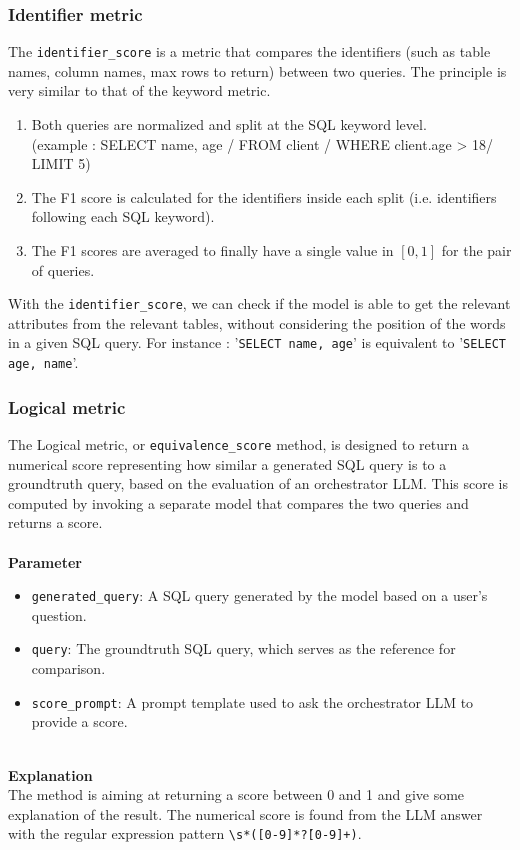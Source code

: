 \documentclass[12pt,a4paper]{article}
\begin{document}
\subsubsection*{Identifier metric}

The \texttt{identifier\_score} is a metric that compares the identifiers (such as table names, column names, max rows to return) between two queries. The principle is very similar to that of the keyword metric.

\begin{enumerate}
    \item Both queries are normalized and split at the SQL keyword level. \\ (example : SELECT name, age / FROM client / WHERE client.age > 18/ LIMIT 5)
    \item The F1 score is calculated for the identifiers inside each split (i.e. identifiers following each SQL keyword).
    \item The F1 scores are averaged to finally have a single value in $[0, 1]$ for the pair of queries.
\end{enumerate}

With the \texttt{identifier\_score}, we can check if the model is able to get the relevant attributes from the relevant tables, without considering the position of the words in a given SQL query.
For instance : '\texttt{SELECT name, age}' is equivalent to '\texttt{SELECT age, name}'.

\subsubsection*{Logical metric}




The Logical metric, or \texttt{equivalence\_score} method, is designed to return a numerical score representing how similar a generated SQL query is to a groundtruth query, based on the evaluation of an orchestrator LLM. This score is computed by invoking a separate model that compares the two queries and returns a score.
\\
\\
\textbf{Parameter}
\begin{itemize}
    \item \texttt{generated\_query}: A SQL query generated by the model based on a user's question.
    \item \texttt{query}: The groundtruth SQL query, which serves as the reference for comparison.
    \item \texttt{score\_prompt}: A prompt template used to ask the orchestrator LLM to provide a score.
\end{itemize}
\\
\textbf{Explanation}
\\
The method is aiming at returning a score between 0 and 1 and give some explanation of the result. The numerical score is found from the LLM answer with the regular expression pattern \texttt{\textbackslash s*([0-9]*\.?[0-9]+)}.
\\
\end{document}
